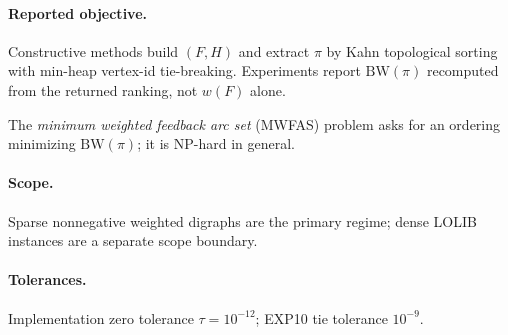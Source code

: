 \paragraph{Reported objective.}
Constructive methods build $(F,H)$ and extract $\pi$ by Kahn topological sorting with min-heap vertex-id tie-breaking.
Experiments report $\mathrm{BW}(\pi)$ recomputed from the returned ranking, not $w(F)$ alone.

The \emph{minimum weighted feedback arc set} (MWFAS) problem asks for an ordering minimizing $\mathrm{BW}(\pi)$; it is NP-hard in general.

\paragraph{Scope.} Sparse nonnegative weighted digraphs are the primary regime; dense LOLIB instances are a separate scope boundary.

\paragraph{Tolerances.} Implementation zero tolerance $\tau=10^{-12}$; EXP10 tie tolerance $10^{-9}$.
